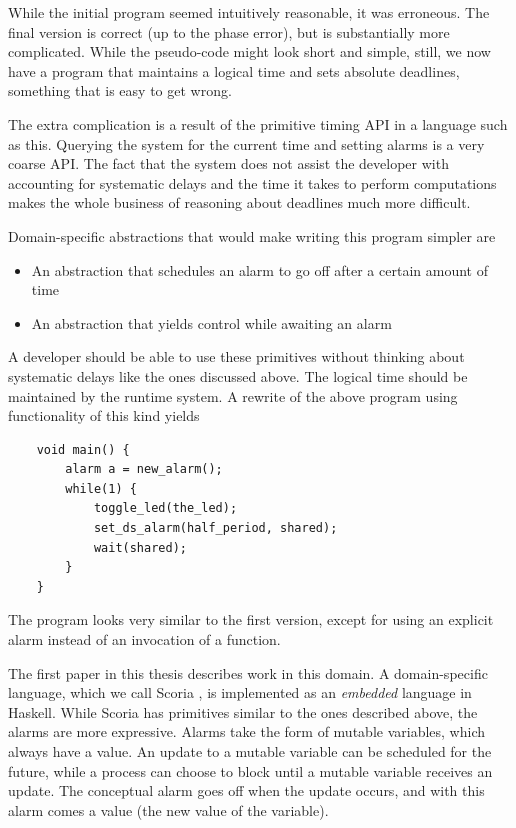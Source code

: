 While the initial program seemed intuitively reasonable, it was erroneous. The final version is
correct (up to the phase error), but is substantially more complicated. While the pseudo-code might look short and
simple, still, we now have a program that maintains a logical time and sets absolute deadlines, something that is easy
to get wrong.

The extra complication is a result of the primitive timing API in a language such as this. Querying the system for the current
time and setting alarms is a very coarse API. The fact that the system does not assist the developer with accounting for
systematic delays and the time it takes to perform computations makes the whole business of reasoning about deadlines much more difficult.

Domain-specific abstractions that would make writing this program simpler are
\begin{itemize}
    \item An abstraction that schedules an alarm to go off after a certain amount of time
    \item An abstraction that yields control while awaiting an alarm
\end{itemize}

A developer should be able to use these primitives without thinking about systematic delays like the ones discussed above.
The logical time should be maintained by the runtime system. A rewrite of the above program using functionality of this
kind yields

\begin{verbatim}
    void main() {
        alarm a = new_alarm();
        while(1) {
            toggle_led(the_led);
            set_ds_alarm(half_period, shared);
            wait(shared);
        }
    }
\end{verbatim}

The program looks very similar to the first version, except for using an explicit alarm instead of an
invocation of a  function.

The first paper in this thesis describes work in this domain. A domain-specific language, which we call
Scoria \cite{DBLP:conf/memocode/KrookHSEC22}, is implemented as an \textit{embedded} language in Haskell. While Scoria
has primitives similar to the ones described above, the alarms are more expressive. Alarms take the form of mutable
variables, which always have a value. An update to a mutable variable can be scheduled for the future, while a process can
choose to block until a mutable variable receives an update. The conceptual alarm goes off when the update occurs, and with
this alarm comes a value (the new value of the variable).

